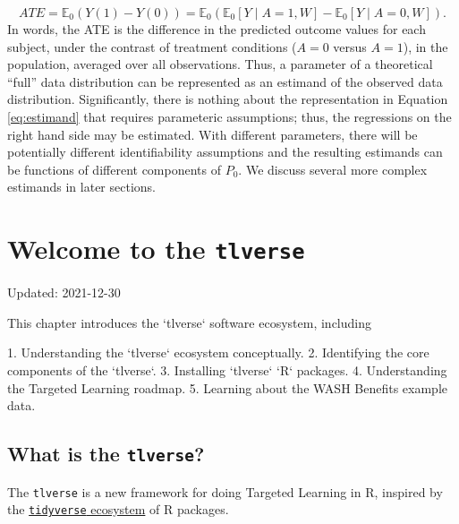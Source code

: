 \documentclass[
  12pt, krantz2,
]{krantz}
\newcommand{\passthrough}[1]{#1}
\newcommand{\E}{\mathbb{E}}
\newcommand{\1}{\mathbbm{1}}
\theoremstyle{definition}
\theoremstyle{definition}
\theoremstyle{definition}
\theoremstyle{definition}
\theoremstyle{remark}
\begin{document}
\begin{equation}
  ATE = \E_0(Y(1) - Y(0)) = \E_0
    \left(\E_0[Y \mid A = 1, W] - \E_0[Y \mid A = 0, W]\right).
  \label{eq:estimand}
\end{equation}
In words, the ATE is the difference in the predicted outcome values for each
subject, under the contrast of treatment conditions (\(A = 0\) versus \(A = 1\)),
in the population, averaged over all observations. Thus, a parameter of a
theoretical ``full'' data distribution can be represented as an estimand of the
observed data distribution. Significantly, there is nothing about the
representation in Equation \eqref{eq:estimand} that requires parameteric
assumptions; thus, the regressions on the right hand side may be estimated.
With different parameters, there will be potentially different identifiability
assumptions and the resulting estimands can be functions of different components
of \(P_0\). We discuss several more complex estimands in later sections.

\hypertarget{tlverse}{%
\chapter{\texorpdfstring{Welcome to the \texttt{tlverse}}{Welcome to the tlverse}}\label{tlverse}}

Updated: 2021-12-30

\begin{VT1}



This chapter introduces the `tlverse` software ecosystem, including

1. Understanding the `tlverse` ecosystem conceptually.
2. Identifying the core components of the `tlverse`.
3. Installing `tlverse` `R` packages.
4. Understanding the Targeted Learning roadmap.
5. Learning about the WASH Benefits example data.

\end{VT1}

\hypertarget{what-is-the-tlverse}{%
\section*{\texorpdfstring{What is the \texttt{tlverse}?}{What is the tlverse?}}\label{what-is-the-tlverse}}


The \passthrough{\lstinline!tlverse!} is a new framework for doing Targeted Learning in R, inspired by
the \href{https://tidyverse.org}{\passthrough{\lstinline!tidyverse!} ecosystem} of R packages.
\end{document}
